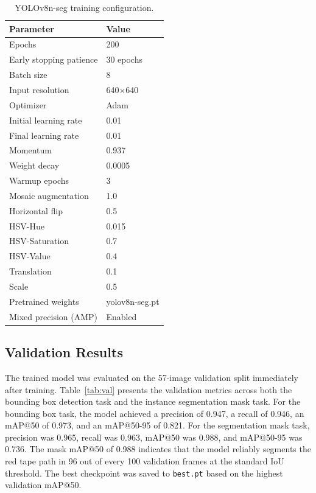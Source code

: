 \begin{table}[tbp]
  \centering
  \caption{YOLOv8n-seg training configuration.}
  \label{tab:training}
  \begin{tabular}{ll}
    \toprule
    Parameter               & Value \\
    \midrule
    Epochs                  & 200 \\
    Early stopping patience & 30 epochs \\
    Batch size              & 8 \\
    Input resolution        & 640$\times$640 \\
    Optimizer               & Adam \\
    Initial learning rate   & 0.01 \\
    Final learning rate     & 0.01 \\
    Momentum                & 0.937 \\
    Weight decay            & 0.0005 \\
    Warmup epochs           & 3 \\
    Mosaic augmentation     & 1.0 \\
    Horizontal flip         & 0.5 \\
    HSV-Hue                 & 0.015 \\
    HSV-Saturation          & 0.7 \\
    HSV-Value               & 0.4 \\
    Translation             & 0.1 \\
    Scale                   & 0.5 \\
    Pretrained weights      & yolov8n-seg.pt \\
    Mixed precision (AMP)   & Enabled \\
    \bottomrule
  \end{tabular}
\end{table}

\subsection{Validation Results}

The trained model was evaluated on the 57-image validation split
immediately after training. Table~\ref{tab:val} presents the validation
metrics across both the bounding box detection task and the instance
segmentation mask task. For the bounding box task, the model achieved a
precision of 0.947, a recall of 0.946, an mAP@50 of 0.973, and an
mAP@50-95 of 0.821. For the segmentation mask task, precision was 0.965,
recall was 0.963, mAP@50 was 0.988, and mAP@50-95 was 0.736. The mask
mAP@50 of 0.988 indicates that the model reliably segments the red tape
path in 96 out of every 100 validation frames at the standard IoU
threshold. The best checkpoint was saved to \texttt{best.pt} based on
the highest validation mAP@50.

